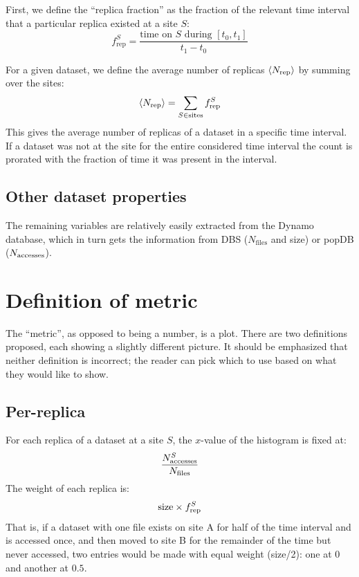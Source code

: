 First, we define the ``replica fraction'' as the fraction of the relevant time
interval that a particular replica existed at a site $S$:
%
\begin{equation}
  f_\textrm{rep}^{S} = \frac{\textrm{time on $S$ during $[t_0,t_1]$}}{t_1 - t_0}
\end{equation}

For a given dataset, we define the average number of replicas $\langle N_\text{rep}\rangle$ by summing over 
the sites:
%
\begin{equation}
  \langle N_\text{rep}\rangle = \sum_{S\in \text{sites}} f_\textrm{rep}^{S}
\end{equation}
%
This gives the average number of replicas of a dataset in a specific time
interval. If a dataset was not at the site for the entire considered time
interval the count is prorated with the fraction of time it was present in the
interval.

\subsection{Other dataset properties}

The remaining variables are relatively easily extracted from the Dynamo database,
which in turn gets the information from DBS ($N_\mathrm{files}$ and size) or popDB
($N_\text{accesses}$).
\section{Definition of metric}

The ``metric'', as opposed to being a number, is a plot. There are two definitions
proposed, each showing a slightly different picture. It should be emphasized that
neither definition is incorrect; the reader can pick which to use based on what
they would like to show.

\subsection{Per-replica}

For each replica of a dataset at a site $S$, the $x$-value of the histogram is 
fixed at:
%
\begin{equation}
  \frac{N_\text{accesses}^S}{N_\mathrm{files}}
\end{equation}
%
The weight of each replica is:
\begin{equation}
  \mathrm{size} \times f_\text{rep}^S
\end{equation}
That is, if a dataset with one file exists on site A for half of the time interval 
and is accessed once, and then moved to site B for the remainder of the time but 
never accessed, two entries would be made with equal weight (size/2): one at $0$ 
and another at $0.5$.



